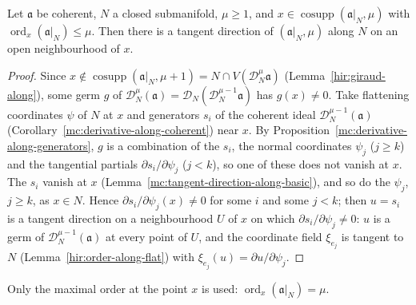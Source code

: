 \begin{proposition}
\label{mc:tangent-direction-along-exists}
\leanok
Let \(\mathfrak a\) be coherent, \(N\) a closed submanifold, \(\mu\ge1\), and \(x\in\operatorname{cosupp}(\mathfrak a|_N,\mu)\) with \(\operatorname{ord}_x(\mathfrak a|_N)\le\mu\). Then
there is a tangent direction of \((\mathfrak a|_N,\mu)\) along \(N\) on an open neighbourhood of \(x\).
\end{proposition}
\begin{proof}
\leanok
Since \(x\notin\operatorname{cosupp}(\mathfrak a|_N,\mu+1)=N\cap V(\mathcal D_N^\mu\mathfrak a)\) (Lemma~\ref{hir:giraud-along}), some germ \(g\) of
\(\mathcal D_N^\mu(\mathfrak a)=\mathcal D_N(\mathcal D_N^{\mu-1}\mathfrak a)\) has \(g(x)\ne0\). Take flattening coordinates \(\psi\) of \(N\) at \(x\) and generators \(s_i\) of the
coherent ideal \(\mathcal D_N^{\mu-1}(\mathfrak a)\) (Corollary~\ref{mc:derivative-along-coherent}) near \(x\). By Proposition~\ref{mc:derivative-along-generators}, \(g\) is a
combination of the \(s_i\), the normal coordinates \(\psi_j\) (\(j\ge k\)) and the tangential partials \(\partial s_i/\partial\psi_j\) (\(j<k\)), so one of these does not vanish
at \(x\). The \(s_i\) vanish at \(x\) (Lemma~\ref{mc:tangent-direction-along-basic}), and so do the \(\psi_j\), \(j\ge k\), as \(x\in N\). Hence
\(\partial s_i/\partial\psi_j(x)\ne0\) for some \(i\) and some \(j<k\); then \(u=s_i\) is a tangent direction on a neighbourhood \(U\) of \(x\) on which
\(\partial s_i/\partial\psi_j\ne0\): \(u\) is a germ of \(\mathcal D_N^{\mu-1}(\mathfrak a)\) at every point of \(U\), and the coordinate field \(\xi_{e_j}\) is tangent to \(N\)
(Lemma~\ref{hir:order-along-flat}) with \(\xi_{e_j}(u)=\partial u/\partial\psi_j\).
\end{proof}
Only the maximal order at the point \(x\) is used: \(\operatorname{ord}_x(\mathfrak a|_N)=\mu\).

